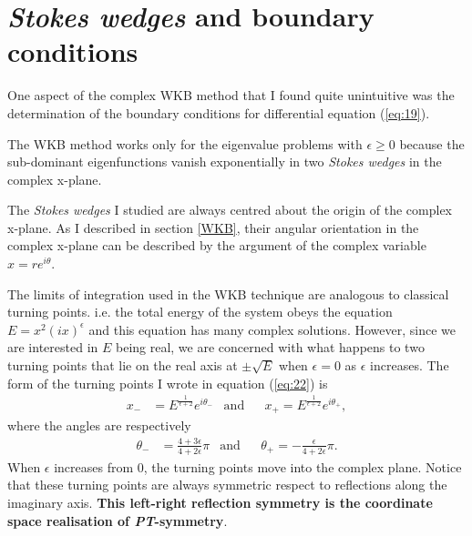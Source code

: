 \documentclass[10pt, a4paper, singlespacing]{report}
\newcommand\PT{\emph{PT}}
\begin{document}
\section{\emph{Stokes wedges} and boundary conditions} \label{Boundary conditions}

One aspect of the complex WKB method that I found quite unintuitive was the determination of the boundary conditions for differential equation (\ref{eq:19}).

The WKB method works only for the eigenvalue problems with $\epsilon \geq 0$ because the sub-dominant eigenfunctions vanish exponentially in two \emph{Stokes wedges} in the complex x-plane\cite{BenderPT}.

The \emph{Stokes wedges} I studied are always centred about the origin of the complex x-plane. As I described in section \ref{WKB}, their angular orientation in the complex x-plane can be described by the argument of the complex variable $x = re^{i\theta}$.

The limits of integration used in the WKB technique are analogous to classical turning points. i.e. the total energy of the system obeys the equation $E = x^2 (ix)^{\epsilon}$ and this equation has many complex solutions. However, since we are interested in $E$ being real, we are concerned with what happens to two turning points that lie on the real axis at $\pm \sqrt{E}$ when $\epsilon = 0$ as $\epsilon$ increases\cite{BenderPT}.
The form of the turning points I wrote in equation (\ref{eq:22}) is 
\begin{align} \label{eq:32}
x_{-}& = 
E^{\frac{1}{\epsilon + 2}}
e^{i\theta_{-}}
&\mathrm{and}&
&x_{+} = E^{\frac{1}{\epsilon + 2}} e^{i\theta_{+}},
\end{align}
where the angles are respectively
\begin{align} \label{eq:33}
\theta_{-}& = \frac{4 + 3\epsilon}{4 + 2 \epsilon} \pi
&\mathrm{and}&
&\theta_{+} = - \frac{\epsilon}{4 + 2 \epsilon} \pi.
\end{align}
When $\epsilon$ increases from 0, the turning points move into the complex plane. Notice that these turning points are always symmetric respect to reflections along the imaginary axis. \textbf{This left-right reflection symmetry is the coordinate space realisation of \PT-symmetry}\cite{BenderPT}.
\end{document}
